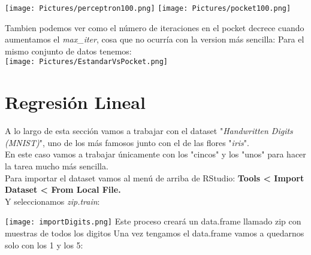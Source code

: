 \documentclass[11pt,fleqn]{book} %
\begin{document}
\texttt{[image: Pictures/perceptron100.png]}
\texttt{[image: Pictures/pocket100.png]}

\pagebreak
Tambien podemos ver como el número de iteraciones en el pocket decrece cuando aumentamos el \textit{max\_iter}, cosa que no ocurría con la version más sencilla:
Para el mismo conjunto de datos tenemos:\\
\texttt{[image: Pictures/EstandarVsPocket.png]}

\pagebreak

\section{Regresión Lineal}
A lo largo de esta sección vamos a trabajar con el dataset "\textit{Handwritten Digits (MNIST)}", uno de los más famosos junto con el de las flores "\textit{iris}".\\
En este caso vamos a trabajar únicamente con los "cincos" y los "unos" para hacer la tarea mucho más sencilla.\\
Para importar el dataset vamos al menú de arriba de RStudio: \textbf{Tools < Import Dataset < From Local File.}\\
Y seleccionamos \textit{zip.train}:

\texttt{[image: importDigits.png]}
Este proceso creará un data.frame llamado zip con muestras de todos los digitos
Una vez tengamos el data.frame vamos a quedarnos solo con los 1 y los 5:
\end{document}

